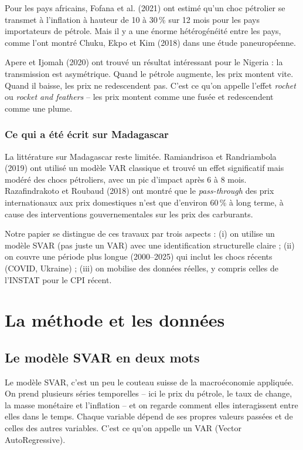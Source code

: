 \documentclass[12pt,a4paper]{article}
\begin{document}
Pour les pays africains, Fofana et al. (2021) ont estimé qu'un choc pétrolier se transmet à l'inflation à hauteur de 10 à 30\,\% sur 12 mois pour les pays importateurs de pétrole. Mais il y a une énorme hétérogénéité entre les pays, comme l'ont montré Chuku, Ekpo et Kim (2018) dans une étude paneuropéenne.

Apere et Ijomah (2020) ont trouvé un résultat intéressant pour le Nigeria : la transmission est asymétrique. Quand le pétrole augmente, les prix montent vite. Quand il baisse, les prix ne redescendent pas. C'est ce qu'on appelle l'effet \emph{rochet} ou \emph{rocket and feathers} -- les prix montent comme une fusée et redescendent comme une plume.

\subsubsection{Ce qui a été écrit sur Madagascar}

La littérature sur Madagascar reste limitée. Ramiandrisoa et Randriambola (2019) ont utilisé un modèle VAR classique et trouvé un effet significatif mais modéré des chocs pétroliers, avec un pic d'impact après 6 à 8 mois. Razafindrakoto et Roubaud (2018) ont montré que le \emph{pass-through} des prix internationaux aux prix domestiques n'est que d'environ 60\,\% à long terme, à cause des interventions gouvernementales sur les prix des carburants.

Notre papier se distingue de ces travaux par trois aspects : (i) on utilise un modèle SVAR (pas juste un VAR) avec une identification structurelle claire ; (ii) on couvre une période plus longue (2000--2025) qui inclut les chocs récents (COVID, Ukraine) ; (iii) on mobilise des données réelles, y compris celles de l'INSTAT pour le CPI récent.

\section{La méthode et les données}

\subsection{Le modèle SVAR en deux mots}

Le modèle SVAR, c'est un peu le couteau suisse de la macroéconomie appliquée. On prend plusieurs séries temporelles -- ici le prix du pétrole, le taux de change, la masse monétaire et l'inflation -- et on regarde comment elles interagissent entre elles dans le temps. Chaque variable dépend de ses propres valeurs passées et de celles des autres variables. C'est ce qu'on appelle un VAR (Vector AutoRegressive).
\end{document}
